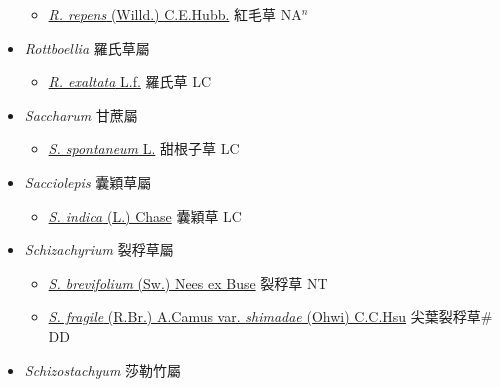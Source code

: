 \begin{itemize}
  \begin{itemize}
        \item[] \href{http://www.theplantlist.org/tpl1.1/search?q=Rhynchelytrum+repens}{\textit{R. repens} (Willd.) C.E.Hubb.}   紅毛草 NA$^n$
  \end{itemize}
 \item[] \textit{Rottboellia} 羅氏草屬
                    
  \begin{itemize}
        \item[] \href{http://www.theplantlist.org/tpl1.1/search?q=Rottboellia+exaltata}{\textit{R. exaltata} L.f.}   羅氏草 LC
  \end{itemize}
 \item[] \textit{Saccharum} 甘蔗屬
                    
  \begin{itemize}
        \item[] \href{http://www.theplantlist.org/tpl1.1/search?q=Saccharum+spontaneum}{\textit{S. spontaneum} L.}   甜根子草 LC
  \end{itemize}
 \item[] \textit{Sacciolepis} 囊穎草屬
                    
  \begin{itemize}
        \item[] \href{http://www.theplantlist.org/tpl1.1/search?q=Sacciolepis+indica}{\textit{S. indica} (L.) Chase}   囊穎草 LC
  \end{itemize}
 \item[] \textit{Schizachyrium} 裂稃草屬
                    
  \begin{itemize}
        \item[] \href{http://www.theplantlist.org/tpl1.1/search?q=Schizachyrium+brevifolium}{\textit{S. brevifolium} (Sw.) Nees ex Buse}   裂稃草 NT
        \item[] \href{http://www.theplantlist.org/tpl1.1/search?q=Schizachyrium+fragile+var.+shimadae}{\textit{S. fragile} (R.Br.) A.Camus var. \textit{shimadae} (Ohwi) C.C.Hsu}   尖葉裂稃草\# DD
  \end{itemize}
 \item[] \textit{Schizostachyum} 莎勒竹屬
                    

\end{itemize}
